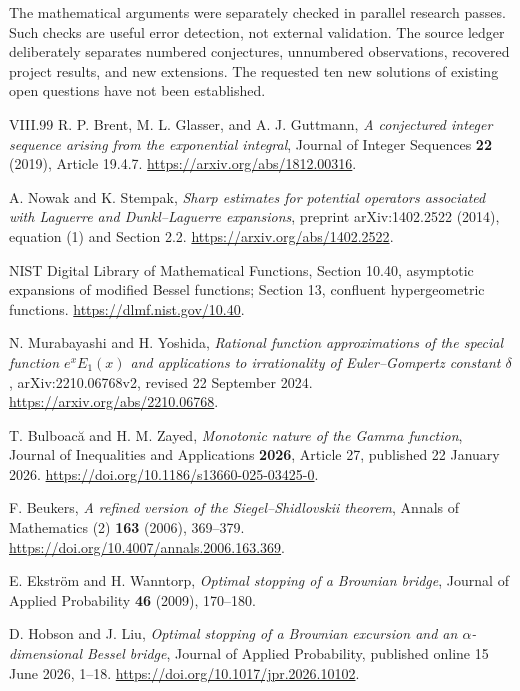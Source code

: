 \documentclass[11pt,a4paper]{article}
\theoremstyle{definition}
\theoremstyle{remark}
\numberwithin{equation}{section}
\begin{document}
The mathematical arguments were separately checked in parallel research
passes. Such checks are useful error detection, not external validation.
The source ledger deliberately separates numbered conjectures, unnumbered
observations, recovered project results, and new extensions. The requested
ten new solutions of existing open questions have not been established.


\small
\begin{thebibliography}{VIII.99}
R. P. Brent, M. L. Glasser, and A. J. Guttmann,
\emph{A conjectured integer sequence arising from the exponential integral},
Journal of Integer Sequences \textbf{22} (2019), Article 19.4.7.
\url{https://arxiv.org/abs/1812.00316}.

A. Nowak and K. Stempak,
\emph{Sharp estimates for potential operators associated with Laguerre
and Dunkl--Laguerre expansions}, preprint arXiv:1402.2522 (2014),
equation (1) and Section 2.2.
\url{https://arxiv.org/abs/1402.2522}.

NIST Digital Library of Mathematical Functions,
Section 10.40, asymptotic expansions of modified Bessel functions;
Section 13, confluent hypergeometric functions.
\url{https://dlmf.nist.gov/10.40}.

N. Murabayashi and H. Yoshida,
\emph{Rational function approximations of the special function
$e^xE_1(x)$ and applications to irrationality of Euler--Gompertz constant
$\delta$}, arXiv:2210.06768v2, revised 22 September 2024.
\url{https://arxiv.org/abs/2210.06768}.

T. Bulboac\u a and H. M. Zayed,
\emph{Monotonic nature of the Gamma function},
Journal of Inequalities and Applications \textbf{2026}, Article 27,
published 22 January 2026.
\url{https://doi.org/10.1186/s13660-025-03425-0}.

F. Beukers, \emph{A refined version of the Siegel--Shidlovskii theorem},
Annals of Mathematics (2) \textbf{163} (2006), 369--379.
\url{https://doi.org/10.4007/annals.2006.163.369}.

E. Ekstr\"om and H. Wanntorp,
\emph{Optimal stopping of a Brownian bridge},
Journal of Applied Probability \textbf{46} (2009), 170--180.

D. Hobson and J. Liu,
\emph{Optimal stopping of a Brownian excursion and an
$\alpha$-dimensional Bessel bridge}, Journal of Applied Probability,
published online 15 June 2026, 1--18.
\url{https://doi.org/10.1017/jpr.2026.10102}.


\end{thebibliography}
\end{document}
